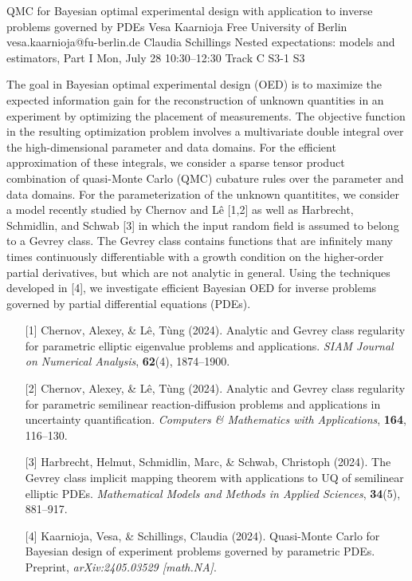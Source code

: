 \begin{talk}
  {QMC for Bayesian optimal experimental design with application to inverse problems governed by PDEs}%
  {Vesa Kaarnioja}%
  {Free University of Berlin}%
  {vesa.kaarnioja@fu-berlin.de}%
  {Claudia Schillings}%
  {Nested expectations: models and estimators, Part I}%
  {Mon, July 28 10:30–12:30 Track C}%
  {S3-1}%
  {S3}%
				
			
The goal in Bayesian optimal experimental design (OED) is to maximize the expected information gain for the reconstruction of unknown quantities in an experiment by optimizing the placement of measurements. The objective function in the resulting optimization problem involves a multivariate double integral over the high-dimensional parameter and data domains. For the efficient approximation of these integrals, we consider a sparse tensor product combination of quasi-Monte Carlo (QMC) cubature rules over the parameter and data domains. For the parameterization of the unknown quantitites, we consider a model recently studied by Chernov and L\^{e} [1,2] as well as Harbrecht, Schmidlin, and Schwab [3] in which the input random field is assumed to belong to a Gevrey class. The Gevrey class contains functions that are infinitely many times continuously differentiable with a growth condition on the higher-order partial derivatives, but which are not analytic in general. Using the techniques developed in [4], we investigate efficient Bayesian OED for inverse problems governed by partial differential equations (PDEs).
\begin{enumerate}
	\item[{[1]}] Chernov, Alexey, \& L\^{e}, T\`{u}ng (2024). Analytic and Gevrey class regularity for parametric elliptic eigenvalue problems and applications. \emph{SIAM Journal on Numerical Analysis}, \textbf{62}(4), 1874--1900.
	\item[{[2]}] Chernov, Alexey, \& L\^{e}, T\`{u}ng (2024). Analytic and Gevrey class regularity for parametric semilinear reaction-diffusion problems and applications in uncertainty quantification. \emph{Computers \& Mathematics with Applications}, \textbf{164}, 116--130.
	\item[{[3]}] Harbrecht, Helmut, Schmidlin, Marc, \& Schwab, Christoph (2024). The Gevrey class implicit mapping theorem with applications to UQ of semilinear elliptic PDEs. \emph{Mathematical Models and Methods in Applied Sciences}, \textbf{34}(5), 881--917.
	\item[{[4]}] Kaarnioja, Vesa, \& Schillings, Claudia (2024). Quasi-Monte Carlo for Bayesian design of experiment problems governed by parametric PDEs. Preprint, \emph{arXiv:2405.03529 [math.NA]}.
\end{enumerate}

\end{talk}

